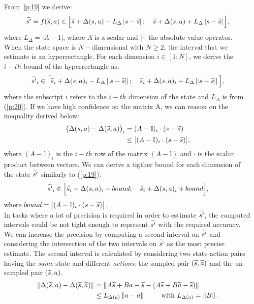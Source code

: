 From~\eqref{p:19} we derive:
\begin{align}
	\widetilde{s'}=f(\widetilde{s}, a) \in \Big[\widetilde{s} + \Delta(s,a) - L_{\Delta} \left|s - \widetilde{s}\right|; \quad \widetilde{s} + \Delta(s,a) + L_{\Delta} \left|s - \widetilde{s}\right|\Big],
\end{align}
where $L_{\Delta} = |A - 1|$, where $A$ is a scalar and $|\cdot|$ the absolute value operator.
When the state space is $N-$dimensional with $N\geq 2$, the interval that we estimate is an hyperrectangle. For each dimension $i \in [1;N]$, we derive the $i-th$ bound of the hyperrectangle as:
\begin{align}
	\widetilde{s'}_{i} \in \Big[\widetilde{s}_{i} + \Delta(s,a)_{i} - L_{\Delta} \left\|s - \widetilde{s}\right\|_{}; \quad \widetilde{s}_{i} + \Delta(s,a)_{i} + L_{\Delta} \left\|s - \widetilde{s}\right\|_{}\Big],
\end{align}
where the subscript $i$ refers to the $i-th$ dimension of the state and $L_{\Delta}$ is from (\ref{p:20}). If we have high confidence on the matrix A, we can reason on the inequality derived below:
\begin{align}
	\big(\Delta(s,a)-\Delta(\widetilde{s},a)\big)_{i} &= (A-\mathbb{I})_{i} \cdot (s-\widetilde{s}) \nonumber\\
	&\leq \big| (A-\mathbb{I})_{i} \cdot (s - \widetilde{s})\big|,
\end{align}
where $(A-\mathbb{I})_{i}$ is the $i-th$ row of the matrix $(A-\mathbb{I})$ and $\cdot$ is the scalar product between vectors. We can derive a tigther bound for each dimension of the state $\widetilde{s'}$ similarly to (\ref{p:19}):
\begin{align}
	\widetilde{s'}_{i} \in \Big[\widetilde{s}_{i} + \Delta(s,a)_{i} - bound; \quad \widetilde{s}_{i} + \Delta(s,a)_{i} + bound \Big],
\end{align}
where $bound = \big| (A-\mathbb{I})_{i} \cdot (s - \widetilde{s})\big|$.\\
\newline
In tasks where a lot of precision is required in order to estimate $\widetilde{s'}$, the computed intervals could be not tight enough to represent $\widetilde{s'}$ with the required accuracy. We can increase the precision by computing a second interval on $\widetilde{s'}$ and considering the intersection of the two intervals on $\widetilde{s'}$ as the most precise estimate. The second interval is calculated by considering two state-action pairs having the \emph{same} state and different \emph{actions}: the sampled pair $(\widetilde{s},\widetilde{a})$ and the un-sampled pair $(\widetilde{s},a)$.
\begin{align}
\left\|\Delta(\widetilde{s},a) - \Delta(\widetilde{s}, \widetilde{a})\right\|_{} &= \left\|A\widetilde{s}+Ba-\widetilde{s} - \left(A\widetilde{s}+B\widetilde{a}-\widetilde{s}\right)\right\|_{} \nonumber \\
&\leq L_{\Delta(a)} \left\|a-\widetilde{a}\right\|_{} \qquad \text{ with } L_{\Delta(a)}=\left\|B\right\|_{}. \label{p:21}
\end{align}
